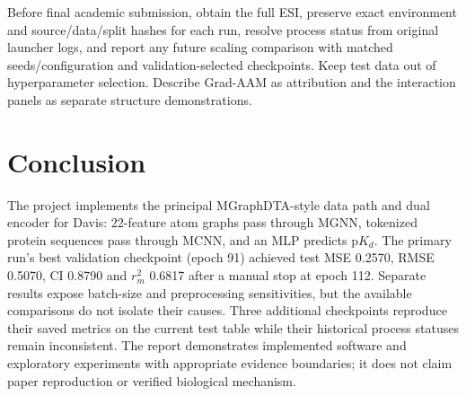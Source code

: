 Before final academic submission, obtain the full ESI, preserve exact environment and source/data/split hashes for each run, resolve process status from original launcher logs, and report any future scaling comparison with matched seeds/configuration and validation-selected checkpoints. Keep test data out of hyperparameter selection. Describe Grad-AAM as attribution and the interaction panels as separate structure demonstrations.

\section{Conclusion}
The project implements the principal MGraphDTA-style data path and dual encoder for Davis: 22-feature atom graphs pass through MGNN, tokenized protein sequences pass through MCNN, and an MLP predicts p$K_d$. The primary run’s best validation checkpoint (epoch 91) achieved test MSE 0.2570, RMSE 0.5070, CI 0.8790 and $r_m^2$ 0.6817 after a manual stop at epoch 112. Separate results expose batch-size and preprocessing sensitivities, but the available comparisons do not isolate their causes. Three additional checkpoints reproduce their saved metrics on the current test table while their historical process statuses remain inconsistent. The report demonstrates implemented software and exploratory experiments with appropriate evidence boundaries; it does not claim paper reproduction or verified biological mechanism.
